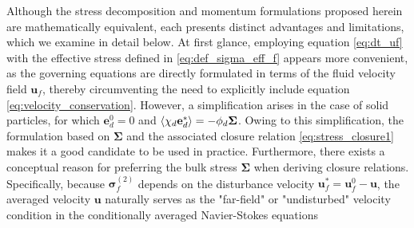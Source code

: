 Although the stress decomposition and momentum formulations proposed herein are mathematically equivalent, each presents distinct advantages and limitations, which we examine in detail below.
At first glance, employing equation \eqref{eq:dt_uf} with the effective stress defined in \eqref{eq:def_sigma_eff_f} appears more convenient, as the governing equations are directly formulated in terms of the fluid velocity field $\textbf{u}_f$, thereby circumventing the need to explicitly include equation \eqref{eq:velocity_conservation}.
However, a simplification arises in the case of solid particles, for which $\textbf{e}_d^0 = 0$ and $\left<\chi_d \textbf{e}_d^*\right> = -\phi_d\bm\Sigma$. 
Owing to this simplification, the formulation based on $\bm\Sigma$ and the associated closure relation \eqref{eq:stress_closure1} makes it a good candidate to be used in practice.%
Furthermore, there exists a conceptual reason for preferring the bulk stress $\bm\Sigma$ when deriving closure relations.  %
Specifically, because $\bm\sigma_f^{(2)}$ depends on the disturbance velocity $\textbf{u}_f^* = \textbf{u}_f^0 - \textbf{u}$, the averaged velocity $\textbf{u}$ naturally serves as the "far-field" or "undisturbed" velocity condition in the conditionally averaged Navier-Stokes equations \citep{hinch1977averaged,fintzi2025}%
